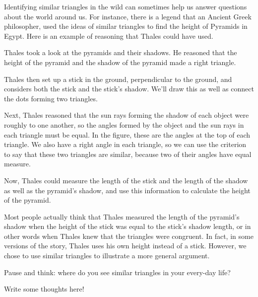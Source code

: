 \documentclass{ximera}
\begin{document}
Identifying similar triangles in the wild can sometimes help us answer questions about the world around us. For instance, there is a legend that an Ancient Greek philosopher,  used the ideas of similar triangles to find the height of Pyramids in Egypt. Here is an example of reasoning that Thales could have used.
\begin{example}
Thales took a look at the pyramids and their shadows. He reasoned that the height of the pyramid and the shadow of the pyramid made a right triangle.
\begin{image}
\end{image}
Thales then set up a stick in the ground, perpendicular to the ground, and considers both the stick and the stick's shadow. We'll draw this as well as connect the dots forming two triangles.
\begin{image}
\end{image}
Next, Thales reasoned that the sun rays forming the shadow of each object were roughly  to one another, so the angles formed by the object and the sun rays in each triangle must be equal. In the figure, these are the angles at the top of each triangle. We also have a right angle in each triangle, so we can use the  criterion to say that these two triangles are similar, because two of their angles have equal measure.

Now, Thales could measure the length of the stick and the length of the shadow as well as the pyramid's shadow, and use this information to calculate the height of the pyramid.

\end{example}
Most people actually think that Thales measured the length of the pyramid's shadow when the height of the stick was equal to the stick's shadow length, or in other words when Thales knew that the triangles were congruent. In fact, in some versions of the story, Thales uses his own height instead of a stick. However, we chose to use similar triangles to illustrate a more general argument.

\begin{question}
Pause and think: where do you see similar triangles in your every-day life?
\begin{freeResponse}
Write some thoughts here!
\end{freeResponse}
\end{question}
\end{document}
